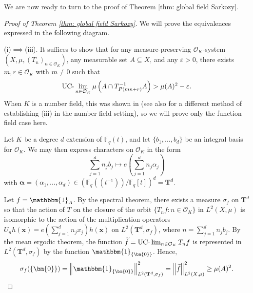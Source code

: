 \documentclass{amsart}
\theoremstyle{definition}
\numberwithin{equation}{section}
\newcommand{\F}{\mathbb{F}}
\newcommand{\mO}{\mathcal{O}}
\newcommand{\eps}{\varepsilon}
\renewcommand{\tilde}{\widetilde}
\newcommand{\UClim}{\textup{UC-}\lim}
\newcommand{\ind}{\mathbbm{1}}
\newcommand{\norm}[2]{\left\| #2 \right\|_{#1}}
\begin{document}
We are now ready to turn to the proof of Theorem \ref{thm: global field Sarkozy}.

\begin{proof}[Proof of Theorem \ref{thm: global field Sarkozy}]
    We will prove the equivalences expressed in the following diagram.

    \begin{center}
    \end{center}

    (i)$\implies$(iii).
	It suffices to show that for any measure-preserving $\mO_K$-system $\left( X, \mu, (T_n)_{n \in \mO_K} \right)$,
	any measurable set $A \subseteq X$, and any $\eps > 0$, there exists $m, r \in \mO_K$ with $m \ne 0$ such that
	\begin{align*}
		\UClim_{n \in \mO_K} \mu \left( A \cap T_{P(mn+r)}^{-1}A \right) > \mu(A)^2 - \eps.
	\end{align*}
    When $K$ is a number field, this was shown in \cite[Theorem 4.1]{ab-roi} (see also \cite[Theorem 1.17]{br} for a different method of establishing (iii) in the number field setting), so we will prove only the function field case here.

    Let $K$ be a degree $d$ extension of $\F_q(t)$, and let $\{b_1, \ldots, b_d\}$ be an integral basis for $\mO_K$.
    We may then express characters on $\mO_K$ in the form
    \begin{equation*}
        \sum_{j=1}^d n_jb_j \mapsto e \left( \sum_{j=1}^d n_j\alpha_j \right)
    \end{equation*}
    with $\bm{\alpha} = (\alpha_1, \ldots, \alpha_d) \in (\F_q((t^{-1}))/\F_q[t])^d = \mathbf{T}^d$.
    
	Let $f = \ind_A$.
	By the spectral theorem, there exists a measure $\sigma_f$ on $\mathbf{T}^d$ so that the action of $T$ on the closure of the orbit
	$\{T_nf : n \in \mO_K\}$ in $L^2(X, \mu)$ is isomorphic to the action of the multiplication operators $U_n h(\bm{x}) = e \left( \sum_{j=1}^d n_j x_j \right) h(\bm{x})$ on $L^2(\mathbf{T}^d, \sigma_f)$, where $n = \sum_{j=1}^d n_j b_j$.
	By the mean ergodic theorem, the function $\tilde{f} = \UClim_{n \in \mO_K} T_nf$ is represented in $L^2(\mathbf{T}^d, \sigma_f)$
	by the function $\ind_{\{\bm{0}\}}$.
	Hence,
 \begin{equation*}
     \sigma_f(\{\bm{0}\}) = \norm{L^2(\mathbf{T}^d, \sigma_f)}{\ind_{\{\bm{0}\}}}^2 = \norm{L^2(X, \mu)}{\tilde{f}}^2 \ge \mu(A)^2.
 \end{equation*}


\end{proof}
\end{document}
